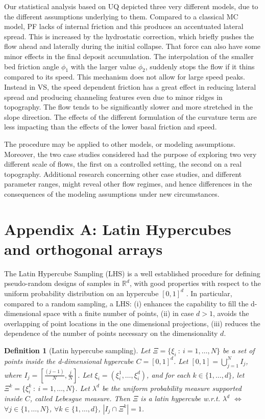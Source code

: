\documentclass{article}
\newtheorem{definition}[theorem]{Definition}
\begin{document}
Our statistical analysis based on UQ depicted three very different models, due to the different assumptions underlying to them. Compared to a classical MC model, PF lacks of internal friction and this produces an accentuated lateral spread. This is increased by the hydrostatic correction, which briefly pushes the flow ahead and laterally during the initial collapse. That force can also have some minor effects in the final deposit accumulation. The interpolation of the smaller bed friction angle $\phi_1$ with the larger value $\phi_2$, suddenly stops the flow if it thins compared to its speed. This mechanism does not allow for large speed peaks. Instead in VS, the speed dependent friction has a great effect in reducing lateral spread and producing channeling features even due to minor ridges in topography. The flow tends to be significantly slower and more stretched in the slope direction. The effects of the different formulation of the curvature term are less impacting than the effects of the lower basal friction and speed.

The procedure may be applied to other models, or modeling assumptions. Moreover, the two case studies considered had the purpose of exploring two very different scale of flows, the first on a controlled setting, the second on a real topography. Additional research concerning other case studies, and different parameter ranges, might reveal other flow regimes, and hence differences in the consequences of the modeling assumptions under new circumstances.


\section{Appendix A: Latin Hypercubes and orthogonal arrays}
The Latin Hypercube Sampling (LHS) is a well established procedure for defining pseudo-random designs of samples in $\mathbb R^d$, with good properties with respect to the uniform probability distribution on an hypercube $[0,1]^d$ \citep{McKay1979,Owen1992b,Stein1987,Ranjan2014,Mingyao2016}. In particular, compared to a random sampling, a LHS: (i) enhances the capability to fill the d-dimensional space with a finite number of points, (ii) in case $d>1$, avoids the overlapping of point locations in the one dimensional projections, (iii) reduces the dependence of the number of points necessary on the dimensionality $d$.

\begin{definition}[Latin hypercube sampling]
Let $\Xi=\{\xi_i\ :\ i=1,\dots,N\}$ be a set of points inside the d-dimensional hypercube $C=[0,1]^d$. Let $[0,1]=\bigcup_{j=1}^{N} I_j$, where $I_j=[\frac{(j-1)}{N},\frac{j}{N}]$. Let $\xi_i=\left(\xi_i^1,\dots,\xi_i^d\right)$, and for each $k\in\{1,\dots,d\}$, let $\Xi^k=\{\xi^k_i\ :\ i=1,\dots,N\}$. Let $\lambda^d$ be the uniform probability measure supported inside $C$, called Lebesgue measure. Then $\Xi$ is a latin hypercube w.r.t. $\lambda^d$ $\Longleftrightarrow$ $\forall j\in \{1,\dots,N\}$, $\forall k\in\{1,\dots,d\}$, $\left|I_j\cap\Xi^k\right|=1$.
\end{definition}
\end{document}
